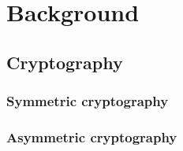 \chapter{Background}
\section{Cryptography}
\subsection{Symmetric cryptography}
\subsection{Asymmetric cryptography}
